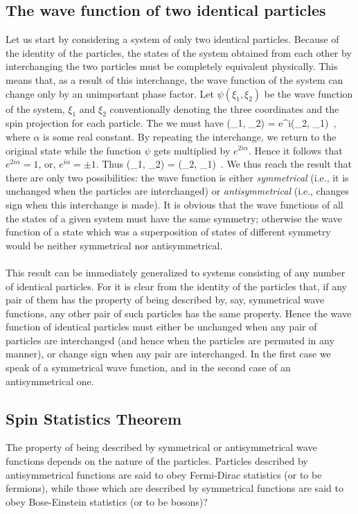 \subsection{The wave function of two identical particles}
Let us start by considering a system of only two identical particles. Because of the identity of the particles, the states of the
system obtained from each other by interchanging the two particles must be completely equivalent physically. This means that, as a 
result of this interchange, the wave function of the system can change only by an unimportant phase factor. Let $\psi(\xi_1, \xi_2)$ be the wave function of the system, $\xi_1$ and $\xi_2$ conventionally denoting the three coordinates and the spin projection for each particle. The we must have
\be
\psi(\xi_1, \xi_2) = e^{i\alpha}\psi(\xi_2, \xi_1)\, ,
\ee
where $\alpha$ is some real constant. By repeating the interchange, we return to the original state while the function $\psi$ gets multiplied by $e^{2i\alpha}$. Hence it follows that $e^{2i\alpha}=1$, or, $e^{i\alpha}=\pm 1$. Thus
\be
\psi(\xi_1, \xi_2) = \pm \psi(\xi_2, \xi_1)\, .
\ee
We thus reach the result that there are only two possibilities: the wave function is either \textit{symmetrical} (i.e., it is unchanged when the particles are interchanged) or \textit{antisymmetrical} (i.e., changes sign when this interchange is made). It is obvious that the wave functions of all the states of a given system must have the same symmetry; otherwise the wave function of a state which was a superposition of states of different symmetry would be neither symmetrical nor antisymmetrical.

\paragraph{}
This result can be immediately generalized to systems consisting of 
any number of identical particles. For it is clear from the identity 
of the particles that, if any pair of them has the property of being 
described by, say, symmetrical wave functions, any other pair of such 
particles has the same property. Hence the wave function of identical 
particles must either be unchanged when any pair of particles are 
interchanged (and hence when the particles are permuted in any 
manner), or change sign when any pair are interchanged. In the first 
case we speak of a symmetrical wave function, and in the second case 
of an antisymmetrical one. 


\subsection{Spin Statistics Theorem}	
The property of being described by symmetrical or antisymmetrical 
wave functions depends on the nature of the particles. Particles 
described by antisymmetrical functions are said to obey Fermi-Dirac 
statistics (or to be fermions), while those which are described by 
symmetrical functions are said to obey Bose-Einstein statistics (or to be 
bosons)? 

